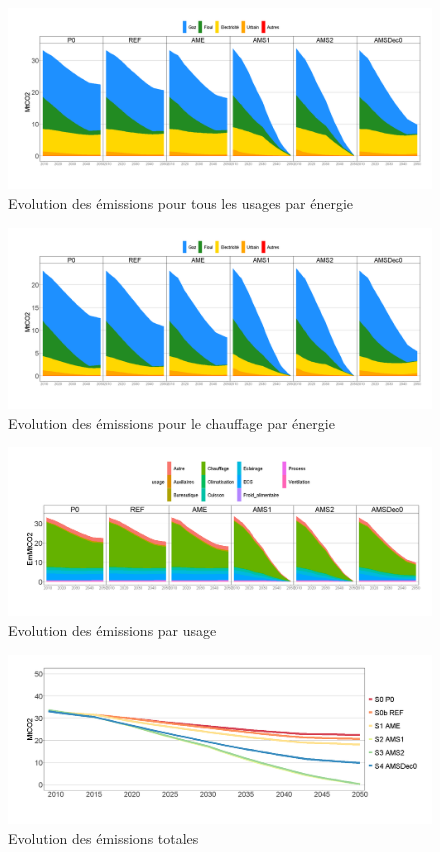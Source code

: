 \documentclass[]{article}
\begin{document}
\begin{figure}
\centering
\includegraphics{Exemple_sortiestertiaire_files/figure-latex/Evol_Em_energie-1.png}
\caption{Evolution des émissions pour tous les usages par énergie}
\end{figure}

\begin{figure}
\centering
\includegraphics{Exemple_sortiestertiaire_files/figure-latex/Evol_Em_energie_chauffage-1.png}
\caption{Evolution des émissions pour le chauffage par énergie}
\end{figure}

\begin{figure}
\centering
\includegraphics{Exemple_sortiestertiaire_files/figure-latex/Evol_Em_usage-1.png}
\caption{Evolution des émissions par usage}
\end{figure}

\begin{figure}
\centering
\includegraphics{Exemple_sortiestertiaire_files/figure-latex/Evol_Em_tot-1.png}
\caption{Evolution des émissions totales}
\end{figure}
\end{document}
